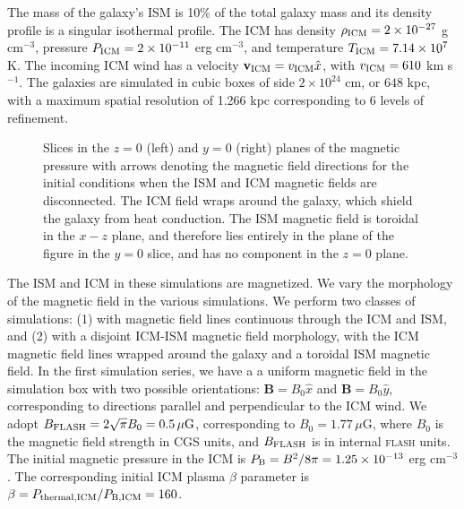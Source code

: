 \documentclass[twocolumn]{aastex6}
\newcommand{\muG}{\, \mu\mbox{G}}
\newcommand{\flash}{{\normalfont\scshape flash }}
\begin{document}
The mass of the galaxy's ISM is 10\% of the total galaxy mass and its density profile is a singular isothermal profile. The ICM has density $\rho_{\rm ICM} = 2 \times 10^{-27}$ g cm$^{-3}$, pressure $P_{\rm ICM} = 2 \times 10^{-11}$ erg cm$^{-3}$, and temperature $T_{\rm ICM} = 7.14 \times 10^7$ K. The incoming ICM wind has a velocity $\mathbf{v_{\rm ICM}} = v_{\rm ICM} \hat{x}$, with $v_{\rm ICM} = 610$ km s$^{-1}$. The galaxies are simulated in cubic boxes of side $2 \times 10^{24}$ cm, or $648$ kpc, with a maximum spatial resolution of 1.266 kpc corresponding to 6 levels of refinement.

\begin{figure*}[!htbp]
  \begin{center}
     \caption{Slices in the $z = 0$ (left) and $y = 0$ (right) planes of the magnetic pressure with arrows denoting the magnetic field directions for the initial conditions when the ISM and ICM magnetic fields are disconnected.  The ICM field wraps around the galaxy, which shield the galaxy from heat conduction. The ISM magnetic field is toroidal in the $x-z$ plane, and therefore lies entirely in the plane of the figure in the $y = 0$ slice, and has no component in the $z = 0$ plane.
\label{fig:magpslc_ic}}
  \end{center}  
\end{figure*}

The ISM and ICM in these simulations are magnetized. We vary the morphology of the magnetic field in the various simulations. We perform two  classes of simulations: (1) with magnetic field lines continuous through the ICM and ISM, and (2) with a disjoint ICM-ISM magnetic field morphology, with the ICM magnetic field lines wrapped around the galaxy and a toroidal ISM magnetic field. In the first simulation series, we have a a uniform magnetic field in the simulation box with two possible orientations: $\mathbf{B} = B_0 \hat{x}$ and $\mathbf{B} = B_0 \hat{y}$, corresponding to directions parallel and perpendicular to the ICM wind. We adopt $B_{\rm FLASH} = 2 \sqrt{\pi} B_0 = 0.5 \muG$, corresponding to $B_0 = 1.77 \muG$, where $B_0$ is the magnetic field strength in CGS units, and $B_{\rm FLASH}$ is in internal \flash units. The initial magnetic pressure in the ICM is $P_{\rm B} = B^2/8\pi = 1.25 \times 10^{-13}$  erg cm$^{-3}$. The corresponding initial ICM plasma $\beta$ parameter is $\beta = P_{\rm thermal, ICM} / P_{\rm B, ICM} = 160$.
\end{document}
